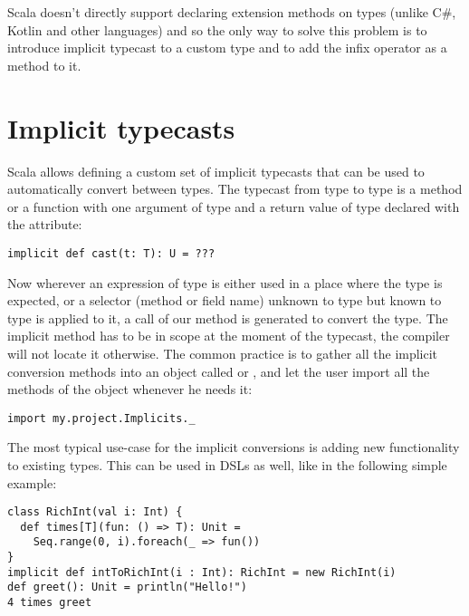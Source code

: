 Scala doesn't directly support declaring extension methods on types (unlike C\#, Kotlin and other languages) and so the only way to solve this problem is to introduce implicit typecast to a custom type and to add the infix operator as a method to it.

\section{Implicit typecasts}

Scala allows defining a custom set of implicit typecasts that can be used to automatically convert between types. The typecast from type  to type  is a method or a function with one argument of type  and a return value of type  declared with the  attribute:

\lstset{style=Scala}
\begin{lstlisting}
implicit def cast(t: T): U = ???
\end{lstlisting}

Now wherever an expression of type  is either used in a place where the type  is expected, or a selector (method or field name) unknown to type  but known to type  is applied to it, a call of our  method is generated to convert the type. The implicit method has to be in scope at the moment of the typecast, the compiler will not locate it otherwise. The common practice is to gather all the implicit conversion methods into an object called  or , and let the user import all the methods of the object whenever he needs it:

\lstset{style=Scala}
\begin{lstlisting}
import my.project.Implicits._
\end{lstlisting}

The most typical use-case for the implicit conversions is adding new functionality to existing types. This can be used in DSLs as well, like in the following simple example:

\lstset{style=Scala}
\begin{lstlisting}
class RichInt(val i: Int) {
  def times[T](fun: () => T): Unit =
    Seq.range(0, i).foreach(_ => fun())
}
implicit def intToRichInt(i : Int): RichInt = new RichInt(i)
def greet(): Unit = println("Hello!")
4 times greet
\end{lstlisting}

